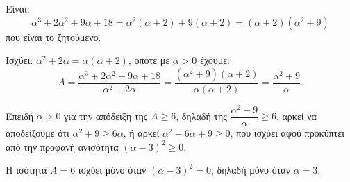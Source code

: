 
\begin{alist}
\item Είναι:
\[\alpha^3 + 2\alpha^2 + 9\alpha + 18 = \alpha^2(\alpha + 2) + 9(\alpha + 2) = (\alpha + 2)(\alpha^2 + 9)\]
που είναι το ζητούμενο.

\item 
\begin{rlist}
\item Ισχύει: $\alpha^2 + 2\alpha = \alpha(\alpha + 2)$, οπότε με $\alpha > 0$ έχουμε:
\[A = \dfrac{\alpha^3 + 2\alpha^2 + 9\alpha + 18}{\alpha^2 + 2\alpha} = \dfrac{(\alpha^2 + 9)(\alpha + 2)}{\alpha(\alpha + 2)} = \dfrac{\alpha^2 + 9}{\alpha}.\]

\item Επειδή $\alpha > 0$ για την απόδειξη της $A \ge 6$, δηλαδή της $\dfrac{\alpha^2 + 9}{\alpha} \ge 6$, αρκεί να αποδείξουμε
ότι $\alpha^2 + 9 \ge 6\alpha$, ή αρκεί $\alpha^2 - 6\alpha + 9 \ge 0$, που ισχύει αφού προκύπτει από την προφανή
ανισότητα $(\alpha - 3)^2 \ge 0$.

Η ισότητα $A = 6$ ισχύει μόνο όταν $(\alpha - 3)^2 = 0$, δηλαδή μόνο όταν $\alpha = 3$.
\end{rlist}
\end{alist}

